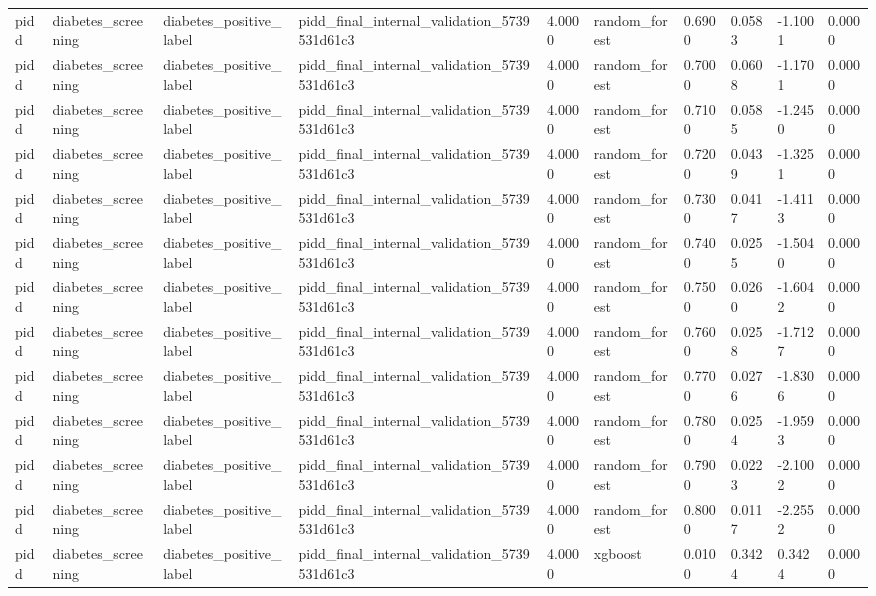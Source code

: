 \begin{tabular}{llllllllll}
pidd & diabetes\_screening & diabetes\_positive\_label & pidd\_final\_internal\_validation\_5739531d61c3 & 4.0000 & random\_forest & 0.6900 & 0.0583 & -1.1001 & 0.0000 \\
pidd & diabetes\_screening & diabetes\_positive\_label & pidd\_final\_internal\_validation\_5739531d61c3 & 4.0000 & random\_forest & 0.7000 & 0.0608 & -1.1701 & 0.0000 \\
pidd & diabetes\_screening & diabetes\_positive\_label & pidd\_final\_internal\_validation\_5739531d61c3 & 4.0000 & random\_forest & 0.7100 & 0.0585 & -1.2450 & 0.0000 \\
pidd & diabetes\_screening & diabetes\_positive\_label & pidd\_final\_internal\_validation\_5739531d61c3 & 4.0000 & random\_forest & 0.7200 & 0.0439 & -1.3251 & 0.0000 \\
pidd & diabetes\_screening & diabetes\_positive\_label & pidd\_final\_internal\_validation\_5739531d61c3 & 4.0000 & random\_forest & 0.7300 & 0.0417 & -1.4113 & 0.0000 \\
pidd & diabetes\_screening & diabetes\_positive\_label & pidd\_final\_internal\_validation\_5739531d61c3 & 4.0000 & random\_forest & 0.7400 & 0.0255 & -1.5040 & 0.0000 \\
pidd & diabetes\_screening & diabetes\_positive\_label & pidd\_final\_internal\_validation\_5739531d61c3 & 4.0000 & random\_forest & 0.7500 & 0.0260 & -1.6042 & 0.0000 \\
pidd & diabetes\_screening & diabetes\_positive\_label & pidd\_final\_internal\_validation\_5739531d61c3 & 4.0000 & random\_forest & 0.7600 & 0.0258 & -1.7127 & 0.0000 \\
pidd & diabetes\_screening & diabetes\_positive\_label & pidd\_final\_internal\_validation\_5739531d61c3 & 4.0000 & random\_forest & 0.7700 & 0.0276 & -1.8306 & 0.0000 \\
pidd & diabetes\_screening & diabetes\_positive\_label & pidd\_final\_internal\_validation\_5739531d61c3 & 4.0000 & random\_forest & 0.7800 & 0.0254 & -1.9593 & 0.0000 \\
pidd & diabetes\_screening & diabetes\_positive\_label & pidd\_final\_internal\_validation\_5739531d61c3 & 4.0000 & random\_forest & 0.7900 & 0.0223 & -2.1002 & 0.0000 \\
pidd & diabetes\_screening & diabetes\_positive\_label & pidd\_final\_internal\_validation\_5739531d61c3 & 4.0000 & random\_forest & 0.8000 & 0.0117 & -2.2552 & 0.0000 \\
pidd & diabetes\_screening & diabetes\_positive\_label & pidd\_final\_internal\_validation\_5739531d61c3 & 4.0000 & xgboost & 0.0100 & 0.3424 & 0.3424 & 0.0000 \\

\end{tabular}
